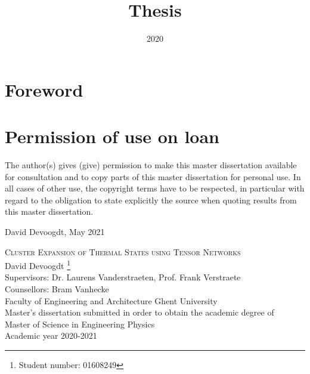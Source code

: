 \documentclass{book}
\title{Thesis}
\date{2020}
\newcounter{a}
\newcounter{b}
\begin{document}



\frontmatter



\newpage
\thispagestyle{empty}
\mbox{}
\newpage



\newpage

\section*{Foreword}


\newpage
\section*{Permission of use on loan}

\vspace*{\fill}

The author(s) gives (give) permission to make this master dissertation available for consultation and to copy parts of this master dissertation for personal use. In all cases of other use, the copyright terms have to be respected, in particular with regard to the obligation to state explicitly the source when quoting results from this master dissertation.

David Devoogdt, May 2021

\newpage


\begin{center}

  \Large{\textsc{Cluster Expansion of Thermal States using Tensor
      Networks}} \\  [0.2cm]

  David Devoogdt \footnote{Student number: 01608249 }\\ [0.3cm]

  \normalsize{Supervisors: Dr. Laurens Vanderstraeten, Prof. Frank Verstraete} \\
  \normalsize{Counsellors: Bram Vanhecke} \\ [0.2cm]
  Faculty of Engineering and Architecture Ghent University\\[0.2cm]
  \small{Master's dissertation submitted in order to obtain the academic degree of \\
    Master of Science in Engineering Physics} \\ [0.2cm]
  \normalsize{Academic year 2020-2021} \\

\end{center}
\end{document}
